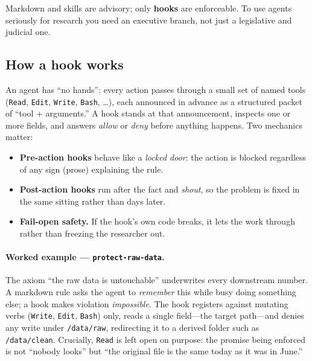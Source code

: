 \documentclass[11pt]{article}
\begin{document}
\begin{keyidea}
Markdown and skills are advisory; only \textbf{hooks} are enforceable. To use
agents seriously for research you need an executive branch, not just a
legislative and judicial one.
\end{keyidea}

\subsection{How a hook works}
An agent has ``no hands'': every action passes through a small set of named tools
(\texttt{Read}, \texttt{Edit}, \texttt{Write}, \texttt{Bash}, \dots), each
announced in advance as a structured packet of ``tool + arguments.'' A hook
stands at that announcement, inspects one or more fields, and answers
\emph{allow} or \emph{deny} before anything happens. Two mechanics matter:

\begin{itemize}[leftmargin=1.6em]
  \item \textbf{Pre-action hooks} behave like a \emph{locked door}: the action is
  blocked regardless of any sign (prose) explaining the rule.
  \item \textbf{Post-action hooks} run after the fact and \emph{shout}, so the
  problem is fixed in the same sitting rather than days later.
  \item \textbf{Fail-open safety.} If the hook's own code breaks, it lets the
  work through rather than freezing the researcher out.
\end{itemize}

\paragraph{Worked example --- \texttt{protect-raw-data}.} The axiom ``the raw
data is untouchable'' underwrites every downstream number. A markdown rule asks
the agent to \emph{remember} this while busy doing something else; a hook makes
violation \emph{impossible}. The hook registers against mutating verbs
(\texttt{Write}, \texttt{Edit}, \texttt{Bash}) only, reads a single field---the
target path---and denies any write under \texttt{/data/raw}, redirecting it to a
derived folder such as \texttt{/data/clean}. Crucially, \texttt{Read} is left
open on purpose: the promise being enforced is not ``nobody looks'' but ``the
original file is the same today as it was in June.''
\end{document}
